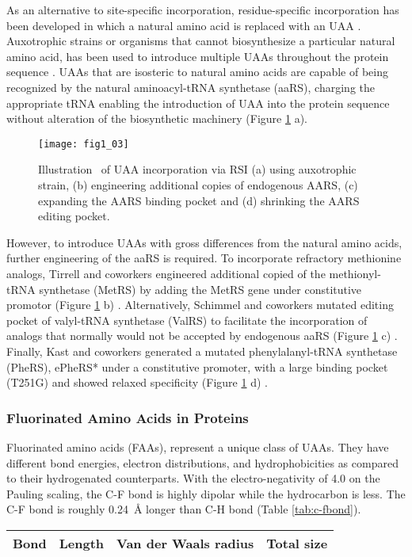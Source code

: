 \begin{refsection}
As an alternative to site-specific incorporation, residue-specific
incorporation has been developed in which a natural amino acid is replaced with
an UAA \cite{Wang2001}. Auxotrophic strains or organisms that cannot
biosynthesize a particular natural amino acid, has been used to introduce
multiple UAAs throughout the protein sequence \cite{Wang2001,Johnson2010}. UAAs
that are isosteric to natural amino acids are capable of being recognized by
the natural aminoacyl-tRNA synthetase (aaRS), charging the appropriate tRNA
enabling the introduction of UAA into the protein sequence without alteration
of the biosynthetic machinery (Figure \ref{fig:rsi} a).
\begin{figure}[h!] \centering \texttt{[image: fig1\_03]} 
    \caption[Illustration  of UAA incorporation via RSI (a) using auxotrophic
    strain, (b) engineering additional copies of endogenous AARS, (c) expanding
the AARS binding pocket and (d) shrinking the AARS editing
pocket.]{Illustration  of UAA incorporation via RSI (a) using auxotrophic
strain, (b) engineering additional copies of endogenous AARS, (c) expanding the
AARS binding pocket and (d) shrinking the AARS editing pocket.} \label{fig:rsi} 
\end{figure}

However, to introduce UAAs with gross differences from the natural amino acids,
further engineering of the aaRS is required. To incorporate refractory
methionine analogs, Tirrell and coworkers engineered additional copied of the
methionyl-tRNA synthetase (MetRS) by adding the MetRS gene under constitutive
promotor (Figure \ref{fig:rsi} b) \cite{Kiick2000}.  Alternatively, Schimmel
and coworkers mutated editing pocket of valyl-tRNA synthetase (ValRS) to
facilitate the incorporation of analogs that normally would not be accepted by
endogenous aaRS (Figure \ref{fig:rsi} c) \cite{Doring2001}.  Finally, Kast and
coworkers generated a mutated phenylalanyl-tRNA synthetase (PheRS), ePheRS*
under a constitutive promoter, with a large binding pocket (T251G) and showed
relaxed specificity (Figure \ref{fig:rsi} d) \cite{Kast1991}.

\subsubsection{Fluorinated Amino Acids in Proteins} 
\label{sec:faa-intro}

Fluorinated amino acids (FAAs), represent a unique class of UAAs. They have
different bond energies, electron distributions, and
hydrophobicities \cite{Biffinger2004} as compared to their hydrogenated
counterparts. With the electro-negativity of 4.0 on the Pauling scaling, the
C-F bond is highly dipolar while the hydrocarbon is less. The C-F bond is
roughly \SI{0.24}{\angstrom} longer than C-H bond (Table
\ref{tab:c-fbond})\cite{Tang2001}. 
\begin{table}[h!]
\centering
\begin{tabular}{ llll }
  \hline
  Bond & Length & Van der Waals radius & Total size \\
  \hline


\end{tabular}
\end{table}
\end{refsection}
